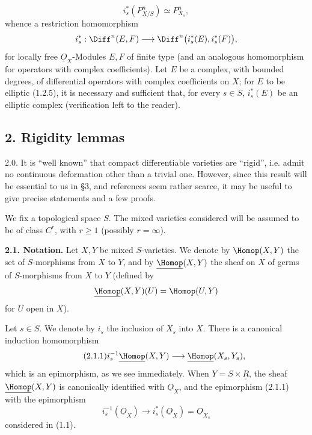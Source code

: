 %
\[
  i_s^*(P^n_{X/S})\simeq P^n_{X_s},
\]
whence a restriction homomorphism
\[
  i_s^*:\Diff^n(E,F)
  \longrightarrow
  \Diff^n\bigl(i_s^*(E),i_s^*(F)\bigr),
\]
for locally free $\underline{O}_X$-Modules $E,F$ of finite type (and an analogous homomorphism for operators with complex coefficients). Let $E$ be a complex, with bounded degrees, of differential operators with complex coefficients on $X$; for $E$ to be elliptic (1.2.5), it is necessary and sufficient that, for every $s\in S$, $i_s^*(E)$ be an elliptic complex (verification left to the reader).

\subsection*{2. Rigidity lemmas}

2.0. It is \textquotedblleft well known\textquotedblright{} that compact differentiable varieties are \textquotedblleft rigid\textquotedblright, i.e. admit no continuous deformation other than a trivial one. However, since this result will be essential to us in \S3, and references seem rather scarce, it may be useful to give precise statements and a few proofs.

We fix a topological space $S$. The mixed varieties considered will be assumed to be of class $C^r$, with $r\ge1$ (possibly $r=\infty$).

\textbf{2.1. Notation.} Let $X,Y$ be mixed $S$-varieties. We denote by $\Homop(X,Y)$ the set of $S$-morphisms from $X$ to $Y$, and by $\underline{\Homop}(X,Y)$ the sheaf on $X$ of germs of $S$-morphisms from $X$ to $Y$ (defined by
\[
  \underline{\Homop}(X,Y)(U)=\Homop(U,Y)
\]
for $U$ open in $X$).

Let $s\in S$. We denote by $i_s$ the inclusion of $X_s$ into $X$. There is a canonical induction homomorphism
\begin{equation}\tag{2.1.1}
  i_s^{-1}\underline{\Homop}(X,Y)
  \longrightarrow
  \underline{\Homop}(X_s,Y_s),
\end{equation}
%
which is an epimorphism, as we see immediately. When $Y=S\times\underline{\underline{R}}$, the sheaf $\underline{\Homop}(X,Y)$ is canonically identified with $\underline{O}_X$, and the epimorphism (2.1.1) with the epimorphism
\[
  i_s^{-1}(\underline{O}_X)\longrightarrow i_s^*(\underline{O}_X)=\underline{O}_{X_s}
\]
considered in (1.1).

